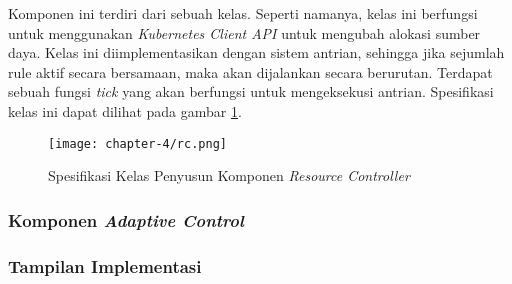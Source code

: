 Komponen ini terdiri dari sebuah kelas. Seperti namanya, kelas ini berfungsi untuk menggunakan \textit{Kubernetes Client API} untuk mengubah alokasi sumber daya. Kelas ini diimplementasikan dengan sistem antrian, sehingga jika sejumlah rule aktif secara bersamaan, maka akan dijalankan secara berurutan. Terdapat sebuah fungsi \textit{tick} yang akan berfungsi untuk mengeksekusi antrian. Spesifikasi kelas ini dapat dilihat pada gambar \ref{fig:rc-spek}.

\begin{figure}[h]
    \centering
    \texttt{[image: chapter-4/rc.png]}
    \caption{Spesifikasi Kelas Penyusun Komponen \textit{Resource Controller}}
    \label{fig:rc-spek}
\end{figure}

\subsubsection{Komponen \textit{Adaptive Control}}

\subsubsection{Tampilan Implementasi}